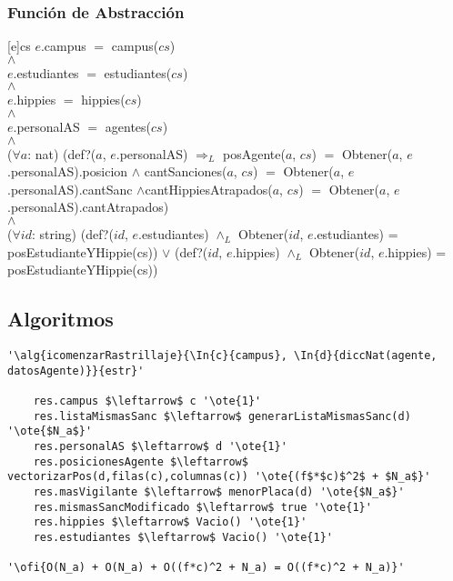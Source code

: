 \subsubsection{Función de Abstracción}
[e]{cs}{
$e$.campus $=$ campus($cs$) 
\\
$\land$
\\
$e$.estudiantes $=$ estudiantes($cs$)
\\
$\land$
\\
$e$.hippies $=$ hippies($cs$)
\\
$\land$
\\
$e$.personalAS $=$ agentes($cs$)
\\
$\land$
\\
($\forall a$: nat) (def?($a$, $e$.personalAS) $\Rightarrow_L$ posAgente($a$, $cs$) $=$ Obtener($a$, $e$.personalAS).posicion $\land$ cantSanciones($a$, $cs$) $=$ Obtener($a$, $e$.personalAS).cantSanc $\land$cantHippiesAtrapados($a$, $cs$) $=$ Obtener($a$, $e$.personalAS).cantAtrapados)
\\
$\land$
\\
($\forall id$: string) (def?($id$, $e$.estudiantes) $\land_L$ Obtener($id$, $e$.estudiantes) = posEstudianteYHippie(cs)) $\lor$ (def?($id$, $e$.hippies) $\land_L$ Obtener($id$, $e$.hippies) = posEstudianteYHippie(cs))
}

\subsection{Algoritmos}

\lstset{style=alg}

\begin{lstlisting}[mathescape]
'\alg{icomenzarRastrillaje}{\In{c}{campus}, \In{d}{diccNat(agente, datosAgente)}}{estr}' 

	res.campus $\leftarrow$ c '\ote{1}'
	res.listaMismasSanc $\leftarrow$ generarListaMismasSanc(d) '\ote{$N_a$}'
	res.personalAS $\leftarrow$ d '\ote{1}'
	res.posicionesAgente $\leftarrow$ vectorizarPos(d,filas(c),columnas(c)) '\ote{(f$*$c)$^2$ + $N_a$}'
	res.masVigilante $\leftarrow$ menorPlaca(d) '\ote{$N_a$}'
	res.mismasSancModificado $\leftarrow$ true '\ote{1}'
	res.hippies $\leftarrow$ Vacio() '\ote{1}'
	res.estudiantes $\leftarrow$ Vacio() '\ote{1}'

'\ofi{O(N_a) + O(N_a) + O((f*c)^2 + N_a) = O((f*c)^2 + N_a)}'
\end{lstlisting}


